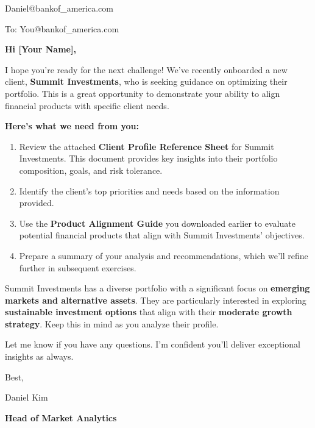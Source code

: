 \documentclass[11pt]{article}
\begin{document}
\begin{tcolorbox}[enhanced, colback=white, colframe=navy, arc=1.5mm,
    boxrule=0.6pt, left=6mm, right=6mm, top=3mm, bottom=4mm,
    colbacktitle=navy, coltitle=white, fonttitle=\bfseries,
    title={\textsc{Bank of America}\hspace{8mm}Client Profile Analysis and
    Product Recommendation}]
\avatar{\faUserTie}\hspace{3mm}%
\begin{minipage}[c]{0.8\linewidth}
Daniel@bankof\_america.com\par
To: You@bankof\_america.com
\end{minipage}
\par\smallskip{\color{pdfred!40}\rule{\linewidth}{0.4pt}}\par\medskip

\textbf{Hi [Your Name],}

I hope you're ready for the next challenge! We've recently onboarded a new
client, \textbf{Summit Investments}, who is seeking guidance on optimizing
their portfolio. This is a great opportunity to demonstrate your ability to
align financial products with specific client needs.

\textbf{Here's what we need from you:}
\begin{enumerate}[leftmargin=1.5em, itemsep=2pt]
  \item Review the attached \textbf{Client Profile Reference Sheet} for Summit
  Investments. This document provides key insights into their portfolio
  composition, goals, and risk tolerance.
  \item Identify the client's top priorities and needs based on the
  information provided.
  \item Use the \textbf{Product Alignment Guide} you downloaded earlier to
  evaluate potential financial products that align with Summit Investments'
  objectives.
  \item Prepare a summary of your analysis and recommendations, which we'll
  refine further in subsequent exercises.
\end{enumerate}

Summit Investments has a diverse portfolio with a significant focus on
\textbf{emerging markets and alternative assets}. They are particularly
interested in exploring \textbf{sustainable investment options} that align
with their \textbf{moderate growth strategy}. Keep this in mind as you analyze
their profile.

Let me know if you have any questions. I'm confident you'll deliver
exceptional insights as always.

\medskip
Best,\par\medskip
Daniel Kim\par
\textbf{Head of Market Analytics}
\end{tcolorbox}
\medskip
\end{document}
